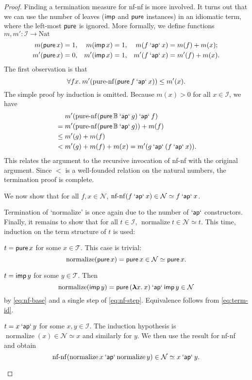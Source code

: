 \begin{proof}
Finding a termination measure for nf-nf is more involved.
It turns out that we can use the number of leaves ($\operatorname{\mathsf{imp}}$ and $\operatorname{\mathsf{pure}}$ instances)
in an idiomatic term, where the left-most $\operatorname{\mathsf{pure}}$ is ignored.
More formally, we define functions $m,m' : \mathcal{I} \to \mathrm{Nat}$
\begin{align*}
	m(\operatorname{\mathsf{pure}} x) &= 1, & m(\operatorname{\mathsf{imp}} x) &= 1, & m(f \mathbin{\mathsf{`ap`}} x) &= m(f) + m(x); \\
	m'(\operatorname{\mathsf{pure}} x) &= 0, & m'(\operatorname{\mathsf{imp}} x) &= 1, & m'(f \mathbin{\mathsf{`ap`}} x) &= m'(f) + m(x).
\end{align*}
The first observation is that
\[ \forall f x.\>m'(\operatorname{pure-nf}(\operatorname{\mathsf{pure}} f \mathbin{\mathsf{`ap`}} x)) \leq m'(x). \]
The simple proof by induction is omitted.
Because $m(x) > 0$ for all $x \in \mathcal{I}$, we have
\begin{align*}
	&\mathrel{\phantom{=}} m'(\operatorname{pure-nf}(\operatorname{\mathsf{pure}} \mathbb{B} \mathbin{\mathsf{`ap`}} g) \mathbin{\mathsf{`ap`}} f) \\
	&= m'(\operatorname{pure-nf}(\operatorname{\mathsf{pure}} \mathbb{B} \mathbin{\mathsf{`ap`}} g)) + m(f) \\
	&\leq m'(g) + m(f) \\
	&< m'(g) + m(f) + m(x) = m'(g \mathbin{\mathsf{`ap`}} (f \mathbin{\mathsf{`ap`}} x)).
\end{align*}
This relates the argument to the recursive invocation of nf-nf with the
original argument.
Since $<$ is a well-founded relation on the natural numbers, the termination
proof is complete.

We now show that for all $f,x \in \mathcal{N}$,
$\operatorname{nf-nf}(f \mathbin{\mathsf{`ap`}} x) \in \mathcal{N} \simeq f \mathbin{\mathsf{`ap`}} x$.
\todo

Termination of `normalize' is once again due to the number of $\mathbin{\mathsf{`ap`}}$ constructors.
Finally, it remains to show that for all $t \in \mathcal{I}$,
$\operatorname{normalize} t \in \mathcal{N} \simeq t$.
This time, induction on the term structure of $t$ is used:
\begin{prfcases}
\item $t = \operatorname{\mathsf{pure}} x$ for some $x \in \mathcal{T}$.
	This case is trivial:
	\[ \operatorname{normalize}(\operatorname{\mathsf{pure}} x) = \operatorname{\mathsf{pure}} x \in \mathcal{N} \simeq \operatorname{\mathsf{pure}} x. \]
\item $t = \operatorname{\mathsf{imp}} y$ for some $y \in \mathcal{T}$.
	Then
	\[ \operatorname{normalize}(\operatorname{\mathsf{imp}} y) = \operatorname{\mathsf{pure}}{({\boldsymbol\lambda} x.\>x)} \mathbin{\mathsf{`ap`}} \operatorname{\mathsf{imp}} y \in \mathcal{N} \]
	by \eqref{eq:nf-base} and a single step of \eqref{eq:nf-step}.
	Equivalence follows from \eqref{eq:term-id}.
\item $t = x \mathbin{\mathsf{`ap`}} y$ for some $x,y \in \mathcal{I}$.
	The induction hypothesis is
	$\operatorname{normalize}(x) \in \mathcal{N} \simeq x$
	and similarly for $y$.
	We then use the result for nf-nf and obtain
	\[ \operatorname{nf-nf}(\operatorname{normalize} x \mathbin{\mathsf{`ap`}} \operatorname{normalize} y)
		\in \mathcal{N} \simeq x \mathbin{\mathsf{`ap`}} y. \qedhere \]
\end{prfcases}
\end{proof}

